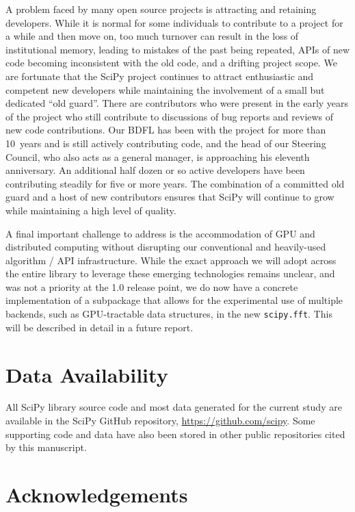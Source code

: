 \documentclass[fleqn,10pt]{wlscirep}
\begin{document}
A problem faced by many open source projects is attracting and retaining developers. While it is normal for some individuals to contribute to a project for a while and then move on, too much turnover can result in the loss of institutional memory, leading to mistakes of the past being repeated, APIs of new code becoming inconsistent with the old code, and a drifting project scope.
We are fortunate that the SciPy project continues to attract enthusiastic and competent new developers while maintaining the involvement of a small but dedicated ``old guard''. There are contributors who were present in the early years of the project who still contribute to discussions of bug reports and reviews of new code contributions. Our BDFL has been with the project for more than 10~years and is still actively contributing code, and the head of our Steering Council, who also acts as a general manager, is approaching his eleventh anniversary. An additional half dozen or so active developers have been contributing steadily for five or more years. The combination of a committed old guard and a host of new contributors ensures that SciPy will continue to grow while maintaining a high level of quality.

A final important challenge to address is the accommodation of GPU and distributed
computing without disrupting our conventional and heavily-used algorithm / API
infrastructure. While the exact approach we will adopt across the entire library
to leverage these emerging technologies remains unclear, and was not a priority
at the 1.0 release point, we do now have a concrete implementation of a subpackage
that allows for the experimental use of multiple backends, such as GPU-tractable
data structures, in the new \texttt{scipy.fft}. This will be described in detail
in a future report.

\section*{Data Availability}
All SciPy library source code and most data generated for the current study are available in the SciPy GitHub repository, \url{https://github.com/scipy}. Some supporting code and data have also been stored in other public repositories cited by this manuscript.



\section*{Acknowledgements}
\end{document}
